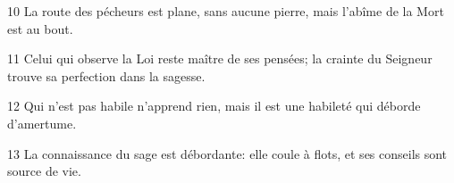 
10 La route des pécheurs est plane, sans aucune pierre, mais l’abîme de la Mort est au bout.

11 Celui qui observe la Loi reste maître de ses pensées; la crainte du Seigneur trouve sa perfection dans la sagesse.

12 Qui n’est pas habile n’apprend rien, mais il est une habileté qui déborde d’amertume.

13 La connaissance du sage est débordante: elle coule à flots, et ses conseils sont source de vie.